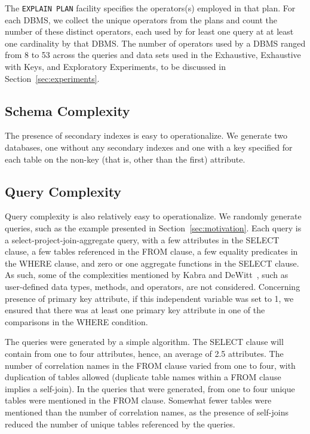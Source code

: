 \documentclass[prodmode,acmtods]{acmsmall}
\begin{document}
The {\tt EXPLAIN PLAN} facility specifies the operators(s) \hbox{employed} in that
plan. For each \hbox{DBMS}, we collect the unique operators from the plans
and count the number of these distinct operators, each used by for least one
query at at least one cardinality by that \hbox{DBMS}. The number of operators used
by a \hbox{DBMS} ranged from 8 to 53 across the queries and data sets
used in the Exhaustive, Exhaustive with Keys, and Exploratory Experiments,
to be discussed in Section~\ref{sec:experiments}.

\subsection{Schema Complexity}
The presence of secondary indexes is easy to operationalize. We generate two
databases, one without any secondary indexes and one with a key specified
for each table on the non-key (that is, other than the first) attribute.

\subsection{Query Complexity}\label{sec:querycomplexity}
Query complexity is also relatively easy to operationalize. We randomly generate queries,
such as the example presented in Section~\ref{sec:motivation}. Each query
is a select-project-join-aggregate query, with a few attributes in the
SELECT clause, a few tables referenced in the FROM clause, a few
equality predicates in the WHERE clause, and zero or one aggregate
functions in the SELECT clause. As such, some of the complexities
mentioned by Kabra and \hbox{DeWitt~\cite{kabra98},} such as
user-defined data types, methods, and operators, are not
considered. Concerning presence of primary key attribute, if this independent
variable was set to 1, we ensured that there was at least one primary key
attribute in one of the comparisons in the WHERE condition.

The queries were generated
by a simple algorithm. 
The SELECT clause will contain from one to four
attributes, hence, an average of 2.5 attributes. The number of
correlation names
in the FROM clause varied from one to four, with duplication of tables
allowed (duplicate table names within a FROM clause implies a self-join).
In the queries that were generated, from one to four unique tables were
mentioned in the FROM clause. Somewhat fewer tables were mentioned than the
number of correlation names, as the presence of self-joins reduced the
number of unique tables referenced by the queries.
\end{document}

